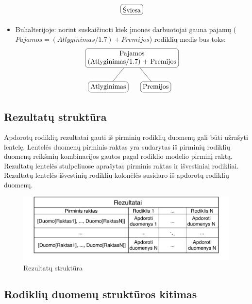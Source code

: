 \documentclass{VUMIFPSbakalaurinis}
\begin{document}
\begin{itemize}
\[\begin{tikzpicture}[sibling distance=7em, every node/.style = {shape=rectangle, rounded                                corners, draw, align=center,	
                                top color=white, bottom color=white}]
            \node{Šviesa};
        \end{tikzpicture} 	
    \]
    \item Buhalterijoje: norint suskaičiuoti kiek įmonės darbuotojai gauna pajamų (\(\textit{Pajamos} = (\textit{Atlyginimas}/1.7) + \textit{Premijos}\)) rodiklių medis bus toks: 
    \[	
        \begin{tikzpicture}[sibling distance=7em,	
            every node/.style = {shape=rectangle, rounded corners,	
                                 draw, align=center,	
                                 top color=white, bottom color=white}]	
            \node {Pajamos\\(Atlyginimas/1.7) + Premijos}	
                    child { node {Atlyginimas} }	
                    child { node {Premijos} } ;	
        \end{tikzpicture} 	
    \]
\end{itemize}  


\subsection{Rezultatų struktūra}

Apdorotų rodiklių rezultatai gauti iš pirminių rodiklių duomenų gali būti užrašyti lentelę. Lentelės duomenų pirminis raktas yra sudarytas iš pirminių rodiklių duomenų reikšmių kombinacijos gautos pagal rodiklio modelio pirminį raktą. Rezultatų lentelės stulpeliuose aprašytas pirminis raktas ir išvestiniai rodikliai. Rezultatų lentelės išvestinių rodiklių kolonėlės susidaro iš apdorotų rodiklių duomenų.

\begin{figure}[H]
    \centering
    \includegraphics[width=1\textwidth]{img/rezultatai.pdf}
    \caption{Rezultatų struktūra}
    \label{img:rezultatai}
\end{figure}

\subsection{Rodiklių duomenų struktūros kitimas}
\end{document}
